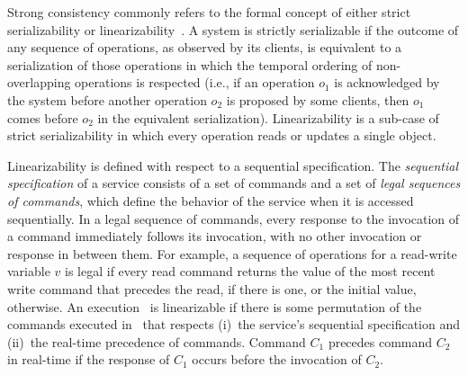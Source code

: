 Strong consistency commonly refers to the formal concept of either strict
serializability or linearizability~\cite{linearizability}. A system is strictly
serializable if the outcome of any sequence of operations, as observed by its
clients, is equivalent to a serialization of those operations in which the
temporal ordering of non-overlapping operations is respected (i.e., if an
operation \emph{$o_1$} is acknowledged by the system before another operation
\emph{$o_2$} is proposed by some clients, then \emph{$o_1$} comes before
\emph{$o_2$} in the equivalent serialization). Linearizability is a sub-case of
strict serializability in which every operation reads or updates a single
object. 

Linearizability is defined with respect to a sequential
specification. The \emph{sequential specification} of a service consists of a
set of commands and a set of \emph{legal sequences of commands}, which define
the behavior of the service when it is accessed sequentially. In a legal
sequence of commands, every response to the invocation of a command immediately
follows its invocation, with no other invocation or response in between them.
For example, a sequence of operations for a read-write variable $v$ is legal if
every read command returns the value of the most recent write command that
precedes the read, if there is one, or the initial value, otherwise. An
execution \ex\ is linearizable if there is some permutation of the commands
executed in \ex\ that respects (i)~the service's sequential specification and
(ii)~the real-time precedence of commands. Command $C_1$ precedes command $C_2$
in real-time if the response of $C_1$ occurs before the invocation of $C_2$.


